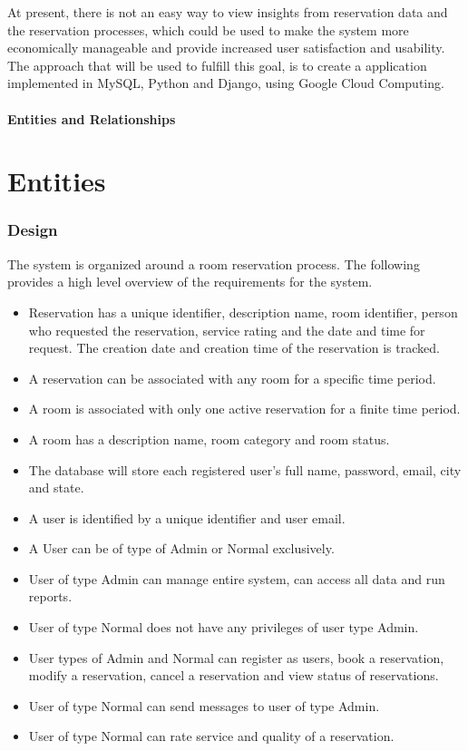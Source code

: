 \documentclass[11pt]{report}
\begin{document}
At present, there is not an easy way to view insights from reservation data and the reservation processes, which could be used to make the system more economically manageable and provide increased user satisfaction and usability.  The approach that will be used to fulfill this goal, is to create a application implemented in MySQL, Python and Django, using Google Cloud Computing. 

\paragraph{Entities and Relationships}

\section*{Entities}
\subsubsection{Design}
The system is organized around a room reservation process. The following provides a high level overview of the requirements for the system.
\begin{itemize}
\item Reservation has a unique identifier, description name, room identifier, person who requested the reservation, service rating and the date and time for request. The creation date and creation time of the reservation is tracked. \item A reservation can be associated with any room for a specific time period.
\item A room is associated with only one active reservation for a finite time period.
\item A room has a description name, room category and room status.
\item The database will store each registered user's full name, password, email, city and state.
\item A user is identified by a unique identifier and user email.
\item A User can be of type of Admin or Normal exclusively.
\item User of type Admin can manage entire system, can access all data and run reports.
\item User of type Normal does not have any privileges of user type Admin.
\item User types of Admin and Normal can register as users, book a reservation, modify a reservation, cancel a reservation and view status of reservations.
\item User of type Normal can send messages to user of type Admin.
\item User of type Normal can rate service and quality of a reservation.
\end{itemize}
\end{document}
